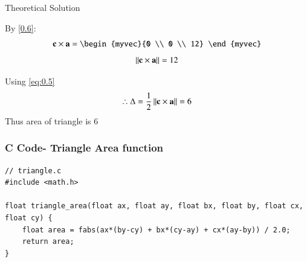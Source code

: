 \documentclass{beamer}
\begin{document}
\begin{frame}{Theoretical Solution}
	
By \eqref{0.6}:
\begin{align}
	\vec{c}\times\vec{a} = \begin{myvec}{0 \\ 0 \\ 12} \end{myvec}
\end{align}
\begin{align}
	\left\lVert\mathbf{c}\times\mathbf{a}\right\rVert = 12
\end{align}



Using \eqref{eq:0.5}
\begin{align}
	\therefore	\Delta = \frac{1}{2}\left\lVert\mathbf{c}\times\mathbf{a}\right\rVert = 6
\end{align}
Thus area of triangle is $6$\\

	\end{frame}

	\begin{frame}[fragile]
	\frametitle{C Code- Triangle Area function }
	
	\begin{lstlisting}
// triangle.c
#include <math.h>

float triangle_area(float ax, float ay, float bx, float by, float cx, float cy) {
	float area = fabs(ax*(by-cy) + bx*(cy-ay) + cx*(ay-by)) / 2.0;
	return area;
}
	\end{lstlisting}
\end{frame}
\end{document}
